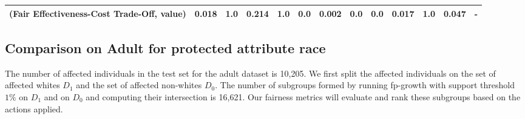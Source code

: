 \documentclass{article}
\begin{document}
\begin{table}[ht]
{\begin{tabular}{lrrrrrrrrrrrr}
(Fair Effectiveness-Cost Trade-Off, value)         &                                     0.018 &                                       1.0 &                            0.214 &                              1.0 &                 0.0 &                                              0.002 &                                       0.0 &                                       0.0 &                                     0.017 &                                       1.0 &                            0.047 &                                          - \\
\bottomrule
\end{tabular}
}
\end{table}




\subsection{Comparison on Adult for protected attribute race}
The number of affected individuals in the test set for the adult dataset is 10,205. We first split the affected individuals on the set of affected whites $D_{1}$ and the set of affected non-whites $D_{0}$. The number of subgroups formed by running fp-growth with support threshold $1\%$ on $D_{1}$ and on $D_{0}$ and computing their intersection is 16,621.  
Our fairness metrics will evaluate and rank these subgroups based on the actions applied.
\end{document}
